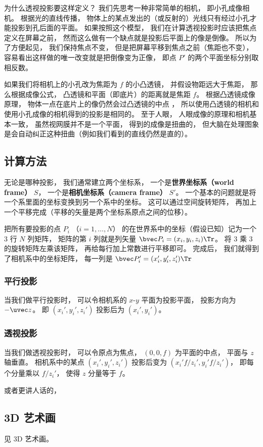 为什么透视投影要这样定义？ 我们先思考一种非常简单的相机， 即小孔成像相机。 根据光的直线传播， 物体上的某点发出的（或反射的）光线只有经过小孔才能投影到孔后面的平面。 如果按照这个模型， 我们在计算透视投影时应该把焦点定义在屏幕之前， 然而这么做有一个缺点就是投影后平面上的像是倒像。 所以为了方便起见， 我们保持焦点不变， 但是把屏幕平移到焦点之前（焦距也不变）， 容易看出这样做的唯一改变就是把倒像变为正像， 即点 $P'$ 的两个平面坐标分别取相反数。 %

如果我们将相机上的小孔改为焦距为 $f$ 的小凸透镜， 并假设物距远大于焦距， 那么根据成像公式， 凸透镜和平面（即底片）的距离就是焦距 $f$。 根据凸透镜成像原理， 物体一点在底片上的像仍然会过凸透镜的中点%
， 所以使用凸透镜的相机和使用小孔成像的相机得到的投影是相同的。 至于人眼， 人眼成像的原理和相机基本一致， 虽然视网膜并不是一个平面， 得到的成像是扭曲的， 但大脑在处理图象是会自动纠正这种扭曲（例如我们看到的直线仍然是直的）。

\subsection{计算方法}
无论是哪种投影， 我们通常建立两个坐标系， 一个是\textbf{世界坐标系（world frame）} $S$， 一个是\textbf{相机坐标系}\textbf{（camera frame）} $S'$。 一个基本的问题就是将一个系里面的坐标变换到另一个系中的坐标。 这可以通过空间旋转矩阵， 再加上一个平移完成（平移的矢量是两个坐标系原点之间的位移）。

把所有要投影的点 $P_i$ （$i = 1, \dots, N$） 的在世界系中的坐标（假设已知）记为一个 3 行 $N$ 列矩阵， 矩阵的第 $i$ 列就是列矢量 $\bvec P_i = (x_i, y_i, z_i)\Tr$。 将 3 乘 3 的旋转矩阵左乘该矩阵， 再给每行加上常数进行平移即可。 完成后， 我们就得到了相机系中的坐标矩阵， 每一列是 $\bvec P_i' = (x_i', y_i', z_i')\Tr$

\subsubsection{平行投影}
当我们做平行投影时， 可以令相机系的 $x$-$y$ 平面为投影平面， 投影方向为 $-\uvec z$。 即 $(x_i', y_i', z_i')$ 投影后为 $(x_i', y_i')$。

\subsubsection{透视投影}
当我们做透视投影时， 可以令原点为焦点， $(0, 0, f)$ 为平面的中点， 平面与 $z$ 轴垂直。 相机系中的某点 $(x_i', y_i', z_i')$ 投影后变为 $(x_i' f/z_i', y_i' f/z_i')$， 即每个分量乘以 $f/z_i'$， 使得 $z$ 分量等于 $f$。

或者更讲人话的，

\subsection{3D 艺术画}
见 3D 艺术画。
